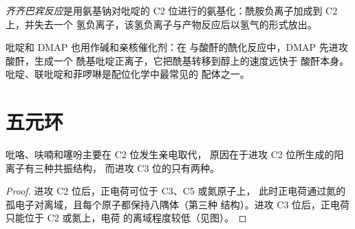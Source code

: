 \begin{definition}[齐齐巴宾反应]\label{def:b3:heterocycles:chichibabin}
\emph{齐齐巴宾反应}是用氨基钠对吡啶的
C2 位进行的氨基化：酰胺负离子加成到 C2 上，并失去一个
氢负离子，该氢负离子与产物反应后以氢气的形式放出。
\end{definition}

吡啶和 DMAP 也用作碱和亲核催化剂：在
与酸酐的酰化反应中，DMAP 先进攻酸酐，生成一个
酰基吡啶正离子，它把酰基转移到醇上的速度远快于
酸酐本身。吡啶、联吡啶和菲啰啉是配位化学中最常见的
配体之一。

\section{五元环}

\begin{proposition}\label{prop:b3:heterocycles:pyrrole-c2}
吡咯、呋喃和噻吩主要在 C2 位发生亲电取代，
原因在于进攻 C2 位所生成的阳离子有三种共振结构，
而进攻 C3 位的只有两种。
\end{proposition}

\begin{proof}
进攻 C2 位后，正电荷可位于 C3、C5 或氮原子上，
此时正电荷通过氮的孤电子对离域，且每个原子都保持八隅体（第三种
结构）。进攻 C3 位后，正电荷只能位于 C2 或氮上，电荷
的离域程度较低（见图）。
\end{proof}

